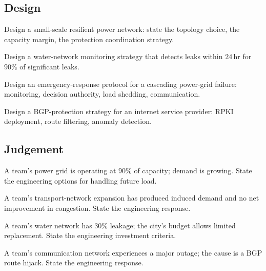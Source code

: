 \subsection*{Design}

\begin{exercise}
Design a small-scale resilient power network: state the topology choice, the capacity margin, the protection coordination strategy.
\end{exercise}

\begin{exercise}
Design a water-network monitoring strategy that detects leaks within $24\,\text{hr}$ for $90\%$ of significant leaks.
\end{exercise}

\begin{exercise}
Design an emergency-response protocol for a cascading power-grid failure: monitoring, decision authority, load shedding, communication.
\end{exercise}

\begin{exercise}
Design a BGP-protection strategy for an internet service provider: RPKI deployment, route filtering, anomaly detection.
\end{exercise}

\subsection*{Judgement}

\begin{exercise}
A team's power grid is operating at $90\%$ of capacity; demand is growing. State the engineering options for handling future load.
\end{exercise}

\begin{exercise}
A team's transport-network expansion has produced induced demand and no net improvement in congestion. State the engineering response.
\end{exercise}

\begin{exercise}
A team's water network has $30\%$ leakage; the city's budget allows limited replacement. State the engineering investment criteria.
\end{exercise}

\begin{exercise}
A team's communication network experiences a major outage; the cause is a BGP route hijack. State the engineering response.
\end{exercise}

